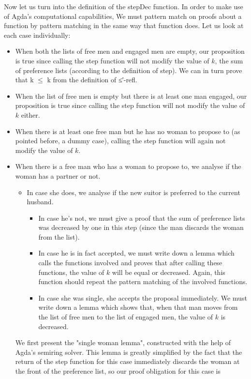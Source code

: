 {Now let us turn into the definition of the stepDec function. In order to make use of Agda's computational capabilities, We must pattern match on proofs about a function by pattern matching in the same way that function does. Let us look at each case individually:

\begin{itemize}
  \item When both the lists of free men and engaged men are empty, our proposition is true since calling the step function will not modify the value of $k$, the sum of preference lists (according to the definition of step). We can in turn prove that k $\le$ k from the definition of ≤′-refl.
  \item When the list of free men is empty but there is at least one man engaged, our proposition is true since calling the step function will not modify the value of $k$ either.
  \item When there is at least one free man but he has no woman to propose to (as pointed before, a dummy case), calling the step function will again not modify the value of $k$.
  \item When there is a free man who has a woman to propose to, we analyse if the woman has a partner or not.
    \begin{itemize}
      \item In case she does, we analyse if the new suitor is preferred to the current husband.
        \begin{itemize}
          \item In case he's not, we must give a proof that the sum of preference lists was decreased by one in this step (since the man discards the woman from the list).
          \item In case he is in fact accepted, we must write down a lemma which calls the functions involved and proves that after calling these functions, the value of $k$ will be equal or decreased. Again, this function should repeat the pattern matching of the involved functions.
      \item In case she was single, she accepts the proposal immediately. We must write down a lemma which shows that, when that man moves from the list of free men to the list of engaged men, the value of $k$ is decreased.
    \end{itemize}
\end{itemize}

We first present the "single woman lemma", constructed with the help of Agda's semiring solver. This lemma is greatly simplified by the fact that the return of the step function for this case immediately discards the woman at the front of the preference list, so our proof obligation for this case is


\end{itemize}}
